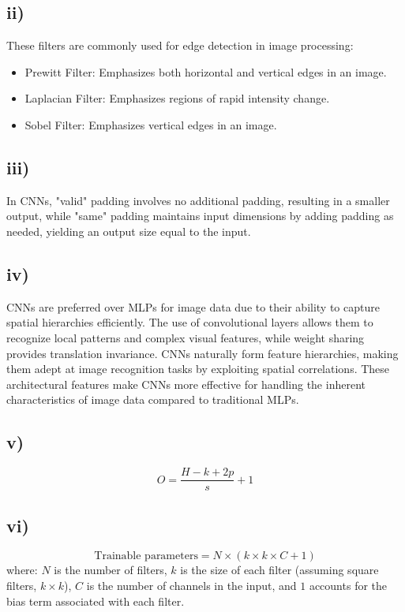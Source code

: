 \subsection*{ii)}
These filters are commonly used for edge detection in image processing: 
\begin{itemize}
    \item Prewitt Filter: Emphasizes both horizontal and vertical edges in an image.
    \item Laplacian Filter: Emphasizes regions of rapid intensity change.
    \item Sobel Filter: Emphasizes vertical edges in an image.
\end{itemize}

\subsection*{iii)}
In CNNs, "valid" padding involves no additional padding, resulting in a smaller output, while "same" padding maintains input dimensions by adding padding as needed, yielding an output size equal to the input.

\subsection*{iv)}
CNNs are preferred over MLPs for image data due to their ability to capture spatial hierarchies efficiently. The use of convolutional layers allows them to recognize local patterns and complex visual features, while weight sharing provides translation invariance. CNNs naturally form feature hierarchies, making them adept at image recognition tasks by exploiting spatial correlations. These architectural features make CNNs more effective for handling the inherent characteristics of image data compared to traditional MLPs.

\subsection*{v)}
\[ O = \frac{{H - k + 2p}}{{s}} + 1 \]

\subsection*{vi)}
\[ \text{Trainable parameters} = N \times (k \times k \times C + 1) \]
where:
\( N \) is the number of filters,
\( k \) is the size of each filter (assuming square filters, \( k \times k \)),
\( C \) is the number of channels in the input, and
\( 1 \) accounts for the bias term associated with each filter.
\newpage
